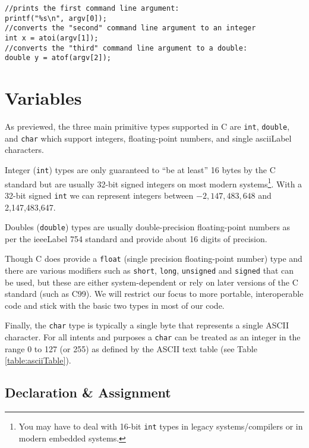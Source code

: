 \begin{verbatim}
//prints the first command line argument:
printf("%s\n", argv[0]);
//converts the "second" command line argument to an integer
int x = atoi(argv[1]);  
//converts the "third" command line argument to a double:
double y = atof(argv[2]);
\end{verbatim}

\section{Variables}

As previewed, the three main primitive types supported in C are \texttt{int},
\texttt{double}, and \texttt{char} which support integers, floating-point
numbers, and single \gls{asciiLabel} characters.  

Integer (\texttt{int}) types are only guaranteed to ``be at least'' 16 bytes by
the C standard but are usually 32-bit signed integers on most modern 
systems\footnote{You may have to deal with 16-bit \texttt{int} types 
in legacy systems/compilers or in modern embedded systems.}.  With a  32-bit signed 
\texttt{int} we can represent integers between $-2,147,483,648$ and 
2,147,483,647.

Doubles (\texttt{double}) types are usually double-precision floating-point
numbers as per the \gls{ieeeLabel} 754 standard and provide about 16 digits
of precision.  

Though C does provide a \texttt{float} (single precision floating-point 
number) type and there are various modifiers such as \texttt{short}, \texttt{long}, 
\texttt{unsigned} and \texttt{signed} that can be used, but these
are either system-dependent or rely on later versions of the C standard (such as
C99).  We will restrict our focus to more portable, interoperable code and stick
with the basic two types in most of our code.

Finally, the \texttt{char} type is typically a single byte that represents a
single ASCII character.  For all intents and purposes a \texttt{char} can 
be treated as an integer in the range 0 to 127 (or 255) as defined by the
ASCII text table (see Table \ref{table:asciiTable}).

\subsection{Declaration \& Assignment}

